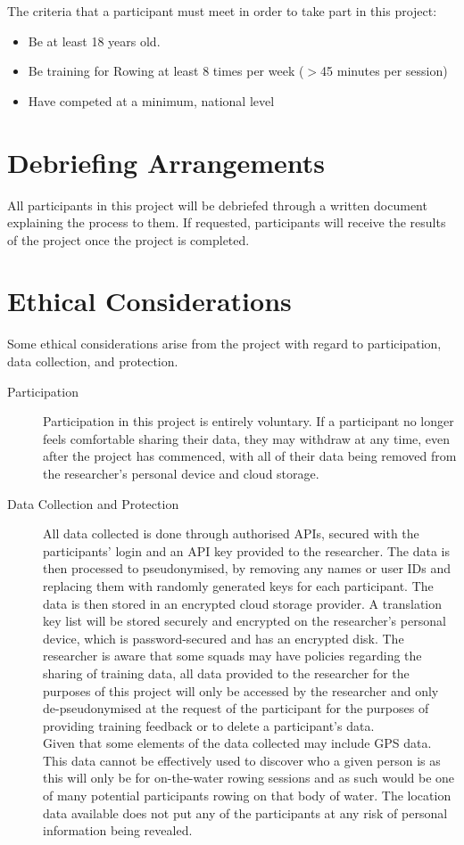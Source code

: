 The criteria that a participant must meet in order to take part in this project:
\begin{itemize}
    \item Be at least 18 years old.
    \item Be training for Rowing at least 8 times per week ($>$45 minutes per session)
    \item Have competed at a minimum, national level
\end{itemize}
\section*{Debriefing Arrangements}
All participants in this project will be debriefed through a written document explaining the process to them. If requested, participants will receive the results of the project once the project is completed.
\section*{Ethical Considerations}
Some ethical considerations arise from the project with regard to participation, data collection, and protection.
\begin{description}
    \item [Participation] Participation in this project is entirely voluntary. If a participant no longer feels comfortable sharing their data, they may withdraw at any time, even after the project has commenced, with all of their data being removed from the researcher's personal device and cloud storage.
    \item [Data Collection and Protection] All data collected is done through authorised APIs, secured with the participants' login and an API key provided to the researcher. The data is then processed to pseudonymised, by removing any names or user IDs and replacing them with randomly generated keys for each participant. The data is then stored in an encrypted cloud storage provider. A translation key list will be stored securely and encrypted on the researcher's personal device, which is password-secured and has an encrypted disk. The researcher is aware that some squads may have policies regarding the sharing of training data, all data provided to the researcher for the purposes of this project will only be accessed by the researcher and only de-pseudonymised at the request of the participant for the purposes of providing training feedback or to delete a participant's data. \\
    Given that some elements of the data collected may include GPS data. This data cannot be effectively used to discover who a given person is as this will only be for on-the-water rowing sessions and as such would be one of many potential participants rowing on that body of water. The location data available does not put any of the participants at any risk of personal information being revealed.
\end{description}
